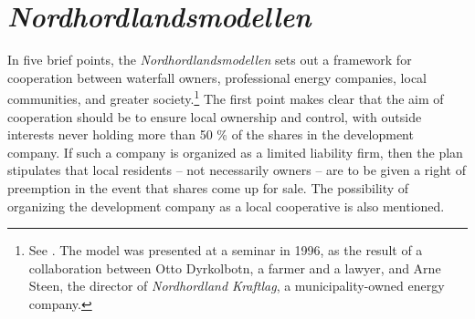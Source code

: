 
\section{{\it Nordhordlandsmodellen}}

In five brief points, the {\it Nordhordlandsmodellen} sets out a framework for cooperation between waterfall owners, professional energy companies, local communities, and greater society.\footnote{See \cite{dyrkolbotn96}. The model was presented at a seminar in 1996, as the result of a collaboration between Otto Dyrkolbotn, a farmer and a lawyer, and Arne Steen, the director of {\it Nordhordland Kraftlag}, a municipality-owned energy company.} %
The first point makes clear that the aim of cooperation should be to ensure local ownership and control, with outside interests never holding more than 50 \% of the shares in the development company. If such a company is organized as a limited liability firm, then the plan stipulates that local residents -- not necessarily owners -- are to be given a right of preemption in the event that shares come up for sale. The possibility of organizing the development company as a local cooperative is also mentioned.


